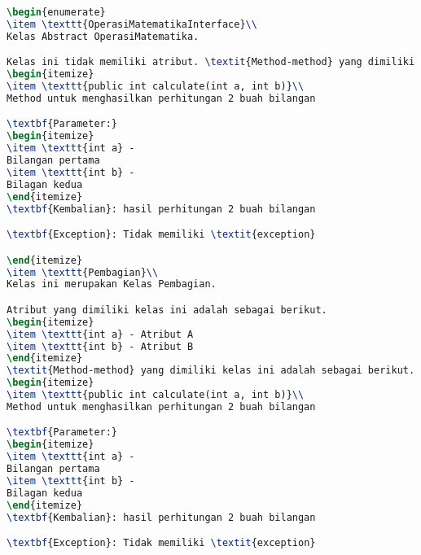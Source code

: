 \begin{lstlisting}[language=TeX, caption=Hasil pengujian kode program sederhana]
\begin{enumerate}
\item \texttt{OperasiMatematikaInterface}\\ 
Kelas Abstract OperasiMatematika.

Kelas ini tidak memiliki atribut. \textit{Method-method} yang dimiliki kelas ini adalah sebagai berikut.
\begin{itemize}
\item \texttt{public int calculate(int a, int b)}\\ 
Method untuk menghasilkan perhitungan 2 buah bilangan

\textbf{Parameter:}
\begin{itemize}
\item \texttt{int a} - 
Bilangan pertama
\item \texttt{int b} - 
Bilagan kedua
\end{itemize}
\textbf{Kembalian}: hasil perhitungan 2 buah bilangan

\textbf{Exception}: Tidak memiliki \textit{exception}

\end{itemize}
\item \texttt{Pembagian}\\ 
Kelas ini merupakan Kelas Pembagian.

Atribut yang dimiliki kelas ini adalah sebagai berikut.
\begin{itemize}
\item \texttt{int a} - Atribut A
\item \texttt{int b} - Atribut B
\end{itemize}
\textit{Method-method} yang dimiliki kelas ini adalah sebagai berikut.
\begin{itemize}
\item \texttt{public int calculate(int a, int b)}\\ 
Method untuk menghasilkan perhitungan 2 buah bilangan

\textbf{Parameter:}
\begin{itemize}
\item \texttt{int a} - 
Bilangan pertama
\item \texttt{int b} - 
Bilagan kedua
\end{itemize}
\textbf{Kembalian}: hasil perhitungan 2 buah bilangan

\textbf{Exception}: Tidak memiliki \textit{exception}


\end{lstlisting}
